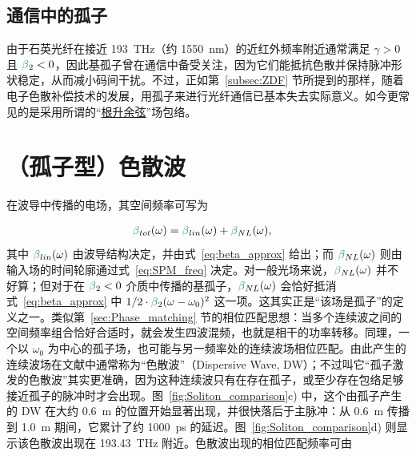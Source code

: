 \subsection{通信中的孤子}
由于石英光纤在接近 193~THz（约 1550~nm）的近红外频率附近通常满足 $\gamma>0$ 且 $\betag_2<0$，因此基孤子曾在通信中备受关注，因为它们能抵抗色散并保持脉冲形状稳定，从而减小码间干扰。不过，正如第~\ref{subsec:ZDF} 节所提到的那样，随着电子色散补偿技术的发展，用孤子来进行光纤通信已基本失去实际意义。如今更常见的是采用所谓的“\href{https://www.youtube.com/watch?v=hCk_cg-OfUQ}{根升余弦}”场包络。

\section{（孤子型）色散波}
在波导中传播的电场，其空间频率可写为

\begin{align}
\betag_{tot}(\omega) &= \betag_{lin}(\omega)+\betag_{NL}(\omega),
\end{align}
其中 $\betag_{lin}(\omega)$ 由波导结构决定，并由式~\ref{eq:beta_approx} 给出；而 $\betag_{NL}(\omega)$ 则由输入场的时间轮廓通过式~\ref{eq:SPM_freq} 决定。对一般光场来说，$\betag_{NL}(\omega)$ 并不好算；但对于在 $\betag_2<0$ 介质中传播的基孤子，$\betag_{NL}(\omega)$ 会恰好抵消式~\ref{eq:beta_approx} 中 $1/2\cdot\betag_2(\omega-\omega_0)^2$ 这一项。这其实正是“该场是孤子”的定义之一。类似第~\ref{sec:Phase_matching} 节的相位匹配思想：当多个连续波之间的空间频率组合恰好合适时，就会发生四波混频，也就是相干的功率转移。同理，一个以 $\omega_0$ 为中心的孤子场，也可能与另一频率处的连续波场相位匹配。由此产生的连续波场在文献中通常称为“色散波”（Dispersive Wave, DW）；不过叫它“孤子激发的色散波”其实更准确，因为这种连续波只有在存在孤子，或至少存在包络足够接近孤子的脉冲时才会出现。图~\ref{fig:Soliton_comparison}c) 中，这个由孤子产生的 DW 在大约 0.6~m 的位置开始显著出现，并很快落后于主脉冲：从 0.6~m 传播到 1.0~m 期间，它累计了约 1000~ps 的延迟。图~\ref{fig:Soliton_comparison}d) 则显示该色散波出现在 193.43~THz 附近。色散波出现的相位匹配频率可由

